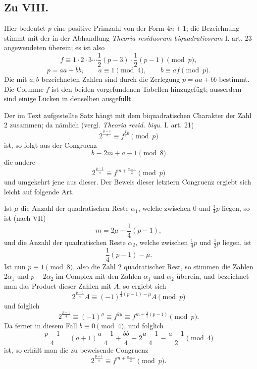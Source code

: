 \documentclass[12pt]{article}
\begin{document}
\subsection*{Zu VIII.}

Hier bedeutet \(p\) eine positive Primzahl von der Form \(4n+1\); die Bezeichnung stimmt mit der in der Abhandlung \emph{Theoria residuorum biquadraticorum} I. art. 23 angewendeten überein; es ist also
\[
f\equiv1\cdot2\cdot3\cdots\frac12(p-3)\cdot\frac12(p-1)\pmod p,
\]
\[
p=aa+bb,\qquad a\equiv1\pmod4,\qquad b\equiv af\pmod p.
\]
Die mit \(a,b\) bezeichneten Zahlen sind durch die Zerlegung \(p=aa+bb\) bestimmt. Die Columne \(f\) ist den beiden vorgefundenen Tabellen hinzugefügt; ausserdem sind einige Lücken in denselben ausgefüllt.

Der im Text aufgestellte Satz hängt mit dem biquadratischen Charakter der Zahl \(2\) zusammen; da nämlich (vergl. \emph{Theoria resid. biqu.} I. art. 21)
\[
2^{\frac{p-1}{4}}\equiv f^{\frac12 b}\pmod p
\]
ist, so folgt aus der Congruenz
\[
b\equiv2m+a-1\pmod8
\]
die andere
\[
2^{\frac{p-1}{4}}\equiv f^{m+\frac{a-1}{2}}\pmod p
\]
und umgekehrt jene aus dieser. Der Beweis dieser letztern Congruenz ergiebt sich leicht auf folgende Art.

Ist \(\mu\) die Anzahl der quadratischen Reste \(\alpha_1\), welche zwischen \(0\) und \(\frac14p\) liegen, so ist (nach VII)
\[
m=2\mu-\frac14(p-1),
\]
und die Anzahl der quadratischen Reste \(\alpha_2\), welche zwischen \(\frac14p\) und \(\frac12p\) liegen, ist
\[
\frac14(p-1)-\mu.
\]
Ist nun \(p\equiv1\pmod8\), also die Zahl \(2\) quadratischer Rest, so stimmen die Zahlen \(2\alpha_1\) und \(p-2\alpha_2\) im Complex mit den Zahlen \(\alpha_1\) und \(\alpha_2\) überein, und bezeichnet man das Product dieser Zahlen mit \(A\), so ergiebt sich
\[
2^{\frac{p-1}{4}}A\equiv(-1)^{\frac14(p-1)-\mu}A\pmod p
\]
und folglich
\[
2^{\frac{p-1}{4}}\equiv(-1)^\mu\equiv f^{2\mu}
\equiv f^{m+\frac12(p-1)}\pmod p.
\]
Da ferner in diesem Fall \(b\equiv0\pmod4\), und folglich
\[
\frac{p-1}{4}=(a+1)\frac{a-1}{4}+\frac{bb}{4}
\equiv2\frac{a-1}{4}\equiv\frac{a-1}{2}\pmod4
\]
ist, so erhält man die zu beweisende Congruenz
\[
2^{\frac{p-1}{4}}\equiv f^{m+\frac{a-1}{2}}\pmod p.
\]
\end{document}
